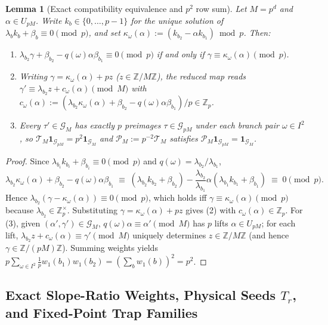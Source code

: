 \documentclass[11pt,a4paper]{article}
\numberwithin{equation}{section}
\newtheorem{lemma}[theorem]{Lemma}
\theoremstyle{definition}
\theoremstyle{remark}
\newcommand{\Z}{\mathbb{Z}}
\newcommand{\cG}{\mathcal{G}}
\newcommand{\cT}{\mathcal{T}}
\newcommand{\cP}{\mathcal{P}}
\begin{document}
\begin{lemma}[Exact compatibility equivalence and $p^2$ row sum]\label{lem:compat}
Let $M = p^d$ and $\alpha \in U_{pM}$. Write $k_b \in \{0, \dots, p-1\}$ for the unique solution of $\lambda_b k_b + \beta_b \equiv 0 \pmod p$, and set $\kappa_\omega(\alpha) := (k_{b_2} - \alpha k_{b_1}) \bmod p$. Then:
\begin{enumerate}[label=(\arabic*)]
\item $\lambda_{b_2}\gamma + \beta_{b_2} - q(\omega)\alpha\beta_{b_1} \equiv 0 \pmod p$ if and only if $\gamma \equiv \kappa_\omega(\alpha) \pmod p$.
\item Writing $\gamma = \kappa_\omega(\alpha) + p z$ ($z \in \Z/M\Z$), the reduced map reads $\gamma' \equiv \lambda_{b_2} z + c_\omega(\alpha) \pmod M$ with $c_\omega(\alpha) := (\lambda_{b_2}\kappa_\omega(\alpha) + \beta_{b_2} - q(\omega)\alpha\beta_{b_1})/p \in \Z_p$.
\item Every $\tau' \in \cG_M$ has exactly $p$ preimages $\tau \in \cG_{pM}$ under each branch pair $\omega \in I^2$, so $\cT_M \mathbf{1}_{\cG_{pM}} = p^2 \mathbf{1}_{\cG_M}$ and $\cP_M := p^{-2}\cT_M$ satisfies $\cP_M \mathbf{1}_{\cG_{pM}} = \mathbf{1}_{\cG_M}$.
\end{enumerate}
\end{lemma}

\begin{proof}
Since $\lambda_{b_i} k_{b_i} + \beta_{b_i} \equiv 0 \pmod p$ and $q(\omega) = \lambda_{b_2}/\lambda_{b_1}$,
\[
\lambda_{b_2}\kappa_\omega(\alpha) + \beta_{b_2} - q(\omega)\alpha\beta_{b_1} \;\equiv\; (\lambda_{b_2} k_{b_2} + \beta_{b_2}) - \frac{\lambda_{b_2}}{\lambda_{b_1}}\alpha(\lambda_{b_1} k_{b_1} + \beta_{b_1}) \;\equiv\; 0 \pmod p.
\]
Hence $\lambda_{b_2}(\gamma - \kappa_\omega(\alpha)) \equiv 0 \pmod p$, which holds iff $\gamma \equiv \kappa_\omega(\alpha) \pmod p$ because $\lambda_{b_2} \in \Z_p^\times$. Substituting $\gamma = \kappa_\omega(\alpha) + p z$ gives (2) with $c_\omega(\alpha) \in \Z_p$. For (3), given $(\alpha', \gamma') \in \cG_M$, $q(\omega)\alpha \equiv \alpha' \pmod M$ has $p$ lifts $\alpha \in U_{pM}$; for each lift, $\lambda_{b_2} z + c_\omega(\alpha) \equiv \gamma' \pmod M$ uniquely determines $z \in \Z/M\Z$ (and hence $\gamma \in \Z/(pM)\Z$). Summing weights yields $p \sum_{\omega \in I^2} \frac{1}{p} w_1(b_1)w_1(b_2) = (\sum_b w_1(b))^2 = p^2$.
\end{proof}

\subsection{Exact Slope-Ratio Weights, Physical Seeds $T_r$, and Fixed-Point Trap Families}\label{subsec:syracuse_weights}
\end{document}
